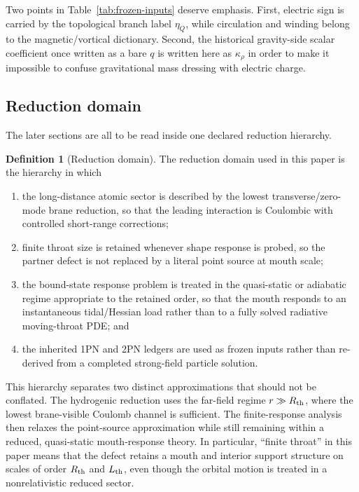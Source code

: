 \documentclass[11pt]{article}
\theoremstyle{plain}
\theoremstyle{definition}
\newtheorem{definition}[theorem]{Definition}
\theoremstyle{remark}
\begin{document}
Two points in Table~\ref{tab:frozen-inputs} deserve emphasis. First, electric sign is carried by the topological branch label $\eta_Q$, while circulation and winding belong to the magnetic/vortical dictionary. Second, the historical gravity-side scalar coefficient once written as a bare $q$ is written here as $\kappa_{\rho}$ in order to make it impossible to confuse gravitational mass dressing with electric charge.

\subsection{Reduction domain}\label{subsec:reduction-domain}

The later sections are all to be read inside one declared reduction hierarchy.

\begin{definition}[Reduction domain]
The reduction domain used in this paper is the hierarchy in which
\begin{enumerate}
    \item the long-distance atomic sector is described by the lowest transverse/zero-mode brane reduction, so that the leading interaction is Coulombic with controlled short-range corrections;
    \item finite throat size is retained whenever shape response is probed, so the partner defect is not replaced by a literal point source at mouth scale;
    \item the bound-state response problem is treated in the quasi-static or adiabatic regime appropriate to the retained order, so that the mouth responds to an instantaneous tidal/Hessian load rather than to a fully solved radiative moving-throat PDE; and
    \item the inherited 1PN and 2PN ledgers are used as frozen inputs rather than re-derived from a completed strong-field particle solution.
\end{enumerate}
\end{definition}

This hierarchy separates two distinct approximations that should not be conflated. The hydrogenic reduction uses the far-field regime $r\gg R_{\rm th}$, where the lowest brane-visible Coulomb channel is sufficient. The finite-response analysis then relaxes the point-source approximation while still remaining within a reduced, quasi-static mouth-response theory. In particular, ``finite throat'' in this paper means that the defect retains a mouth and interior support structure on scales of order $R_{\rm th}$ and $L_{\rm th}$, even though the orbital motion is treated in a nonrelativistic reduced sector.
\end{document}
